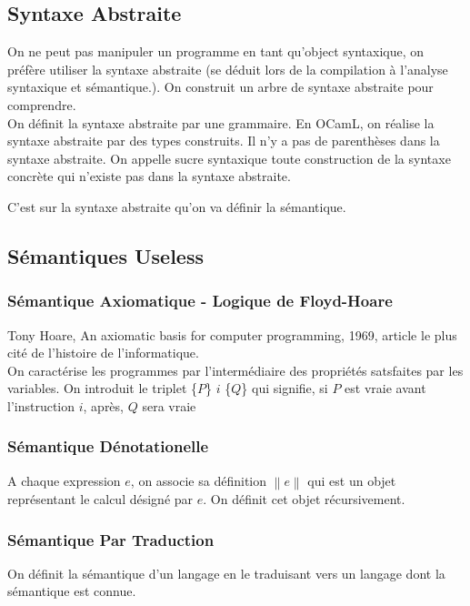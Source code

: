 \documentclass{cours}
\begin{document}
\subsection{Syntaxe Abstraite}
On ne peut pas manipuler un programme en tant qu'object syntaxique, on préfère utiliser la syntaxe abstraite (se déduit lors de la compilation à l'analyse syntaxique et sémantique.). On construit un arbre de syntaxe abstraite pour comprendre.\\
On définit la syntaxe abstraite par une grammaire. En OCamL, on réalise la syntaxe abstraite par des types construits. Il n'y a pas de parenthèses dans la syntaxe abstraite. On appelle sucre syntaxique toute construction de la syntaxe concrète qui n'existe pas dans la syntaxe abstraite.

C'est sur la syntaxe abstraite qu'on va définir la sémantique.

\subsection{Sémantiques Useless}
\subsubsection{Sémantique Axiomatique - Logique de Floyd-Hoare}
Tony Hoare, An axiomatic basis for computer programming, 1969, article le plus cité de l'histoire de l'informatique.\\
On caractérise les programmes par l'intermédiaire des propriétés satsfaites par les variables. On introduit le triplet \{$P$\} $i$ \{$Q$\} qui signifie, si $P$ est vraie avant l'instruction $i$, après, $Q$ sera vraie

\subsubsection{Sémantique Dénotationelle}
A chaque expression $e$, on associe sa définition $\left\lVert e\right\rVert $ qui est un objet représentant le calcul désigné par $e$. On définit cet objet récursivement.\\

\subsubsection{Sémantique Par Traduction}
On définit la sémantique d'un langage en le traduisant vers un langage dont la sémantique est connue.
\end{document}
